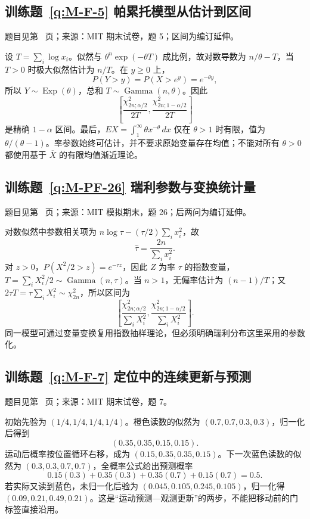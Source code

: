 \subsection*{训练题~\ref{q:M-F-5} 帕累托模型从估计到区间}\label{a:M-F-5}{\small 题目见第~\pageref{q:M-F-5} 页；来源：MIT 期末试卷，题 5；区间为编订延伸。}
\begin{solve}设 $T=\sum_i\log x_i$。似然与 $\theta^n\exp(-\theta T)$ 成比例，故对数导数为 $n/\theta-T$，当 $T>0$ 时极大似然估计为 $n/T$。在 $y\ge0$ 上，\[P(Y>y)=P(X>e^y)=e^{-\theta y},\]所以 $Y\sim\operatorname{Exp}(\theta)$，总和 $T\sim\operatorname{Gamma}(n,\theta)$。因此\[\left[\frac{\chi^2_{2n;\alpha/2}}{2T},\frac{\chi^2_{2n;1-\alpha/2}}{2T}\right]\]是精确 $1-\alpha$ 区间。最后，$EX=\int_1^\infty\theta x^{-\theta}\,dx$ 仅在 $\theta>1$ 时有限，值为 $\theta/(\theta-1)$。率参数始终可估计，并不要求原始变量存在均值；不能对所有 $\theta>0$ 都使用基于 $\overline X$ 的有限均值渐近理论。\end{solve}

\subsection*{训练题~\ref{q:M-PF-26} 瑞利参数与变换统计量}\label{a:M-PF-26}{\small 题目见第~\pageref{q:M-PF-26} 页；来源：MIT 模拟期末，题 26；后两问为编订延伸。}
\begin{solve}对数似然中参数相关项为 $n\log\tau-(\tau/2)\sum_i x_i^2$，故\[\widehat\tau=\frac{2n}{\sum_i x_i^2}.\]对 $z>0$，$P(X^2/2>z)=e^{-\tau z}$，因此 $Z$ 为率 $\tau$ 的指数变量，$T=\sum_iX_i^2/2\sim\operatorname{Gamma}(n,\tau)$。当 $n>1$，无偏率估计为 $(n-1)/T$；又 $2\tau T=\tau\sum_iX_i^2\sim\chi^2_{2n}$，所以区间为\[\left[\frac{\chi^2_{2n;\alpha/2}}{\sum_iX_i^2},\frac{\chi^2_{2n;1-\alpha/2}}{\sum_iX_i^2}\right].\]同一模型可通过变量变换复用指数抽样理论，但必须明确瑞利分布这里采用的参数化。\end{solve}

\subsection*{训练题~\ref{q:M-F-7} 定位中的连续更新与预测}\label{a:M-F-7}{\small 题目见第~\pageref{q:M-F-7} 页；来源：MIT 期末试卷，题 7。}
\begin{solve}初始先验为 $(1/4,1/4,1/4,1/4)$。橙色读数的似然为 $(0.7,0.7,0.3,0.3)$，归一化后得到\[(0.35,0.35,0.15,0.15).\]运动后概率按位置循环右移，成为 $(0.15,0.35,0.35,0.15)$。下一次蓝色读数的似然为 $(0.3,0.3,0.7,0.7)$，全概率公式给出预测概率\[0.15(0.3)+0.35(0.3)+0.35(0.7)+0.15(0.7)=0.5.\]若实际又读到蓝色，未归一化后验为 $(0.045,0.105,0.245,0.105)$，归一化得 $(0.09,0.21,0.49,0.21)$。这是“运动预测—观测更新”的两步，不能把移动前的门标签直接沿用。\end{solve}


